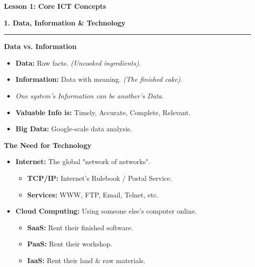 \documentclass[a4paper, 8pt]{extarticle}
\newcommand{\sectionheading}[1]{\large\textbf{#1}\par\noindent\rule{\linewidth}{0.4pt}}
\newcommand{\subsectionheading}[1]{\normalsize\textbf{#1}}
\begin{document}
\pagestyle{empty} %

\begin{center}
    \fontsize{12pt}{14pt}\selectfont
    \textbf{Lesson 1: Core ICT Concepts}
\end{center}
\vspace{1em}

\begin{multicols}{2}


\sectionheading{1. Data, Information \& Technology}
\vspace{0.5em}
\subsectionheading{Data vs. Information}
\begin{itemize}
    \item \textbf{Data:} Raw facts. \textit{(Uncooked ingredients)}.
    \item \textbf{Information:} Data with meaning. \textit{(The finished cake)}.
    \item \textit{One system's Information can be another's Data.}
    \item \textbf{Valuable Info is:} Timely, Accurate, Complete, Relevant.
    \item \textbf{Big Data:} Google-scale data analysis.
\end{itemize}

\subsectionheading{The Need for Technology}
\begin{itemize}
    \item \textbf{Internet:} The global "network of networks".
        \begin{itemize}
            \item \textbf{TCP/IP:} Internet's Rulebook / Postal Service.
            \item \textbf{Services:} WWW, FTP, Email, Telnet, etc.
        \end{itemize}
    \item \textbf{Cloud Computing:} Using someone else's computer online.
        \begin{itemize}
            \item \textbf{SaaS:} Rent their finished software.
            \item \textbf{PaaS:} Rent their workshop.
            \item \textbf{IaaS:} Rent their land \& raw materials.
        \end{itemize}
\end{itemize}


\end{multicols}
\end{document}

